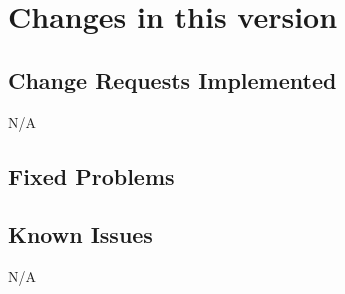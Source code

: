 \chapter{Changes in this version}

\section{Change Requests Implemented}
N/A

\section{Fixed Problems}


\section{Known Issues}
N/A
